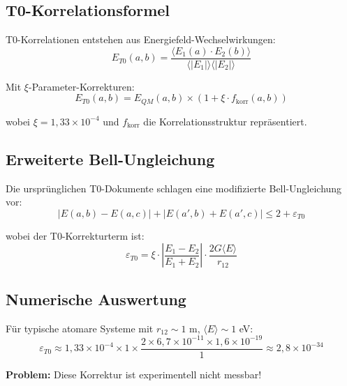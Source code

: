 \documentclass[12pt,a4paper]{article}
\begin{document}
		\subsection{T0-Korrelationsformel}
		
		T0-Korrelationen entstehen aus Energiefeld-Wechselwirkungen:
		\begin{equation}
			E_{T0}(a,b) = \frac{\langle E_1(a) \cdot E_2(b) \rangle}{\langle |E_1| \rangle \langle |E_2| \rangle}
		\end{equation}
		
		Mit $\xi$-Parameter-Korrekturen:
		\begin{equation}
			E_{T0}(a,b) = E_{QM}(a,b) \times (1 + \xi \cdot f_{\text{korr}}(a,b))
		\end{equation}
		
		wobei $\xi = 1{,}33 \times 10^{-4}$ und $f_{\text{korr}}$ die Korrelationsstruktur repr\"asentiert.
		
		\subsection{Erweiterte Bell-Ungleichung}
		
		Die urspr\"unglichen T0-Dokumente schlagen eine modifizierte Bell-Ungleichung vor:
		\begin{equation}
			|E(a,b) - E(a,c)| + |E(a',b) + E(a',c)| \leq 2 + \varepsilon_{T0}
		\end{equation}
		
		wobei der T0-Korrekturterm ist:
		\begin{equation}
			\varepsilon_{T0} = \xi \cdot \left|\frac{E_1 - E_2}{E_1 + E_2}\right| \cdot \frac{2G\langle E \rangle}{r_{12}}
		\end{equation}
		
		\subsection{Numerische Auswertung}
		
		F\"ur typische atomare Systeme mit $r_{12} \sim 1$ m, $\langle E \rangle \sim 1$ eV:
		\begin{equation}
			\varepsilon_{T0} \approx 1{,}33 \times 10^{-4} \times 1 \times \frac{2 \times 6{,}7 \times 10^{-11} \times 1{,}6 \times 10^{-19}}{1} \approx 2{,}8 \times 10^{-34}
		\end{equation}
		
		\textbf{Problem:} Diese Korrektur ist experimentell nicht messbar!
	
\end{document}
